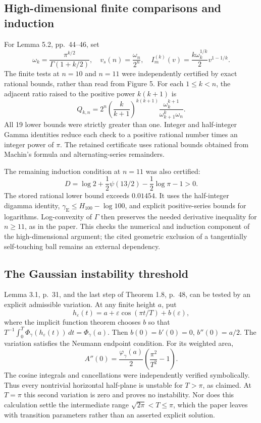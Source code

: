 \documentclass[10pt]{article}
\begin{document}
\subsection*{High-dimensional finite comparisons and induction}
For Lemma 5.2, pp. 44–46, set \[\omega_k=\frac{\pi^{k/2}}{\Gamma(1+k/2)},\quad
 v_s(n)=\frac{\omega_n}{2^n},\quad
 I_m^{(k)}(v)=\frac{k\omega_k^{1/k}}2v^{1-1/k}.\] The finite tests at \(n=10\) and \(n=11\) were independently certified by exact rational bounds, rather than read from Figure 5. For each \(1\leq k<n\), the adjacent ratio raised to the positive power \(k(k+1)\) is \[Q_{k,n}
 =2^n\left(\frac{k}{k+1}\right)^{k(k+1)}
 \frac{\omega_k^{k+1}}{\omega_{k+1}^{k}\omega_n}.\] All 19 lower bounds were strictly greater than one. Integer and half-integer Gamma identities reduce each check to a positive rational number times an integer power of \(\pi\). The retained certificate uses rational bounds obtained from Machin’s formula and alternating-series remainders.\par
The remaining induction condition at \(n=11\) was also certified: \[D=\log2+\frac12\psi(13/2)-\frac12\log\pi-1>0.\] The stored rational lower bound exceeds \(0.01454\). It uses the half-integer digamma identity, \(\gamma_{\mathrm E}\leq H_{100}-\log100\), and explicit positive-series bounds for logarithms. Log-convexity of \(\Gamma\) then preserves the needed derivative inequality for \(n\geq11\), as in the paper. This checks the numerical and induction component of the high-dimensional argument; the cited geometric exclusion of a tangentially self-touching ball remains an external dependency.\par
\subsection*{The Gaussian instability threshold}
Lemma 3.1, p. 31, and the last step of Theorem 1.8, p. 48, can be tested by an explicit admissible variation. At any finite height \(a\), put \[h_\varepsilon(t)=a+\varepsilon\cos(\pi t/T)+b(\varepsilon),\] where the implicit function theorem chooses \(b\) so that \(T^{-1}\int_0^T\Phi_\gamma(h_\varepsilon(t))\,dt=\Phi_\gamma(a)\). Then \(b(0)=b'(0)=0\), \(b''(0)=a/2\). The variation satisfies the Neumann endpoint condition. For its weighted area, \[A''(0)=\frac{\varphi_\gamma(a)}2
 \left(\frac{\pi^2}{T^2}-1\right).\] The cosine integrals and cancellations were independently verified symbolically. Thus every nontrivial horizontal half-plane is unstable for \(T>\pi\), as claimed. At \(T=\pi\) this second variation is zero and proves no instability. Nor does this calculation settle the intermediate range \(\sqrt{2\pi}<T\leq\pi\), which the paper leaves with transition parameters rather than an asserted explicit solution.\par
\end{document}
